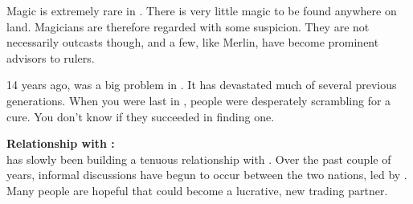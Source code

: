 \documentclass[blue]{NeptuneBall}
\begin{document}
Magic is extremely rare in \pAmerica{}. There is very little magic to be found anywhere on land. Magicians are therefore regarded with some suspicion. They are not necessarily outcasts though, and a few, like Merlin, have become prominent advisors to rulers.

14 years ago, \cPolio{} was  a big problem in \pAmerica{}. It has devastated much of several previous generations. When you were last in \pAmerica{}, people were desperately scrambling for a cure. You don't know if they succeeded in finding one.

{\bf Relationship with \pAtlantis{}:}\\
\pAmerica{} has slowly been building a tenuous relationship with \pAtlantis{}. Over the past couple of years, informal discussions  have begun to occur between the two nations, led by \cAriel{\King} \cAriel{}. Many people are hopeful that \pAtlantis{} could become a lucrative, new trading partner.
\end{document}
